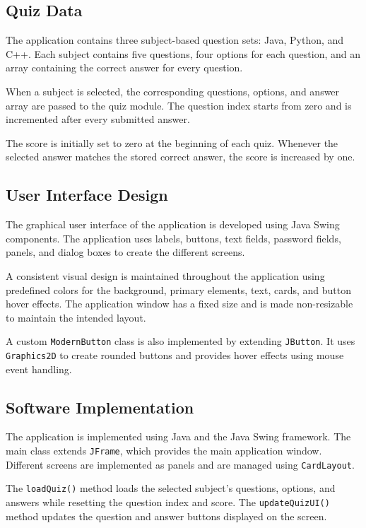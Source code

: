 \documentclass[11pt,a4paper]{report}  %
\begin{document}
\subsection{Quiz Data}

The application contains three subject-based question sets: Java, Python, and C++. Each subject contains five questions, four options for each question, and an array containing the correct answer for every question.

When a subject is selected, the corresponding questions, options, and answer array are passed to the quiz module. The question index starts from zero and is incremented after every submitted answer.

The score is initially set to zero at the beginning of each quiz. Whenever the selected answer matches the stored correct answer, the score is increased by one.



\subsection{User Interface Design}

The graphical user interface of the application is developed using Java Swing components. The application uses labels, buttons, text fields, password fields, panels, and dialog boxes to create the different screens.

A consistent visual design is maintained throughout the application using predefined colors for the background, primary elements, text, cards, and button hover effects. The application window has a fixed size and is made non-resizable to maintain the intended layout.

A custom \texttt{ModernButton} class is also implemented by extending \texttt{JButton}. It uses \texttt{Graphics2D} to create rounded buttons and provides hover effects using mouse event handling.



\subsection{Software Implementation}

The application is implemented using Java and the Java Swing framework. The main class extends \texttt{JFrame}, which provides the main application window. Different screens are implemented as panels and are managed using \texttt{CardLayout}.

The \texttt{loadQuiz()} method loads the selected subject's questions, options, and answers while resetting the question index and score. The \texttt{updateQuizUI()} method updates the question and answer buttons displayed on the screen.
\end{document}
